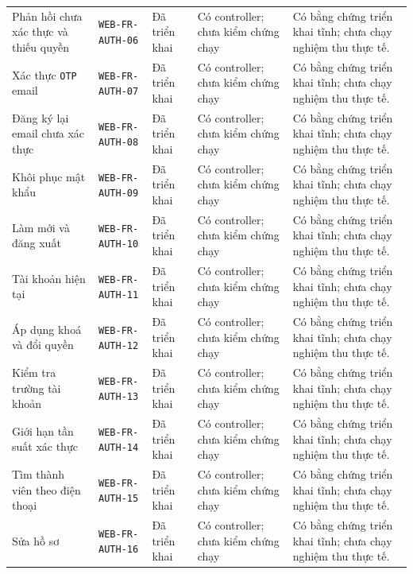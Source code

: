 \begin{longtable}{@{}P{0.19000\SRSWidth}P{0.18000\SRSWidth}P{0.15000\SRSWidth}P{0.20000\SRSWidth}P{0.28000\SRSWidth}@{}}
Phản hồi chưa xác thực và thiếu quyền & \texttt{WEB-\allowbreak{}FR-\allowbreak{}AUTH-\allowbreak{}06} & Đã triển khai & Có controller; chưa kiểm chứng chạy & Có bằng chứng triển khai tĩnh; chưa chạy nghiệm thu thực tế. \\[3pt]
Xác thực \texttt{OTP} email & \texttt{WEB-\allowbreak{}FR-\allowbreak{}AUTH-\allowbreak{}07} & Đã triển khai & Có controller; chưa kiểm chứng chạy & Có bằng chứng triển khai tĩnh; chưa chạy nghiệm thu thực tế. \\[3pt]
Đăng ký lại email chưa xác thực & \texttt{WEB-\allowbreak{}FR-\allowbreak{}AUTH-\allowbreak{}08} & Đã triển khai & Có controller; chưa kiểm chứng chạy & Có bằng chứng triển khai tĩnh; chưa chạy nghiệm thu thực tế. \\[3pt]
Khôi phục mật khẩu & \texttt{WEB-\allowbreak{}FR-\allowbreak{}AUTH-\allowbreak{}09} & Đã triển khai & Có controller; chưa kiểm chứng chạy & Có bằng chứng triển khai tĩnh; chưa chạy nghiệm thu thực tế. \\[3pt]
Làm mới và đăng xuất & \texttt{WEB-\allowbreak{}FR-\allowbreak{}AUTH-\allowbreak{}10} & Đã triển khai & Có controller; chưa kiểm chứng chạy & Có bằng chứng triển khai tĩnh; chưa chạy nghiệm thu thực tế. \\[3pt]
Tài khoản hiện tại & \texttt{WEB-\allowbreak{}FR-\allowbreak{}AUTH-\allowbreak{}11} & Đã triển khai & Có controller; chưa kiểm chứng chạy & Có bằng chứng triển khai tĩnh; chưa chạy nghiệm thu thực tế. \\[3pt]
Áp dụng khoá và đổi quyền & \texttt{WEB-\allowbreak{}FR-\allowbreak{}AUTH-\allowbreak{}12} & Đã triển khai & Có controller; chưa kiểm chứng chạy & Có bằng chứng triển khai tĩnh; chưa chạy nghiệm thu thực tế. \\[3pt]
Kiểm tra trường tài khoản & \texttt{WEB-\allowbreak{}FR-\allowbreak{}AUTH-\allowbreak{}13} & Đã triển khai & Có controller; chưa kiểm chứng chạy & Có bằng chứng triển khai tĩnh; chưa chạy nghiệm thu thực tế. \\[3pt]
Giới hạn tần suất xác thực & \texttt{WEB-\allowbreak{}FR-\allowbreak{}AUTH-\allowbreak{}14} & Đã triển khai & Có controller; chưa kiểm chứng chạy & Có bằng chứng triển khai tĩnh; chưa chạy nghiệm thu thực tế. \\[3pt]
Tìm thành viên theo điện thoại & \texttt{WEB-\allowbreak{}FR-\allowbreak{}AUTH-\allowbreak{}15} & Đã triển khai & Có controller; chưa kiểm chứng chạy & Có bằng chứng triển khai tĩnh; chưa chạy nghiệm thu thực tế. \\[3pt]
Sửa hồ sơ & \texttt{WEB-\allowbreak{}FR-\allowbreak{}AUTH-\allowbreak{}16} & Đã triển khai & Có controller; chưa kiểm chứng chạy & Có bằng chứng triển khai tĩnh; chưa chạy nghiệm thu thực tế. \\[3pt]

\end{longtable}
